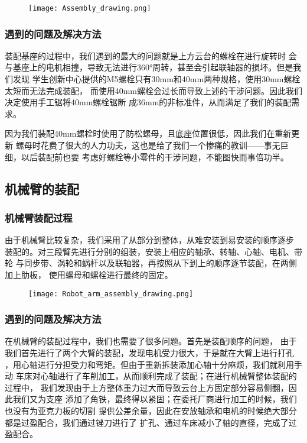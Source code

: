 \begin{figure}[!htp]
    \centering
    \texttt{[image: Assembly\_drawing.png]}
    \label{fig:基座装配图}
\end{figure}

\subsubsection{遇到的问题及解决方法}

{\songti 装配基座的过程中，我们遇到的最大的问题就是上方云台的螺栓在进行旋转时
会与基座上的电机相撞，导致无法进行360°周转，甚至会引起联轴器的损坏。但是我们发现
学生创新中心提供的M5螺栓只有30mm和40mm两种规格，使用30mm螺栓太短而无法完成装配，
而使用40mm螺栓会过长而导致上述的干涉问题。因此我们决定使用手工锯将40mm螺栓锯断
成36mm的非标准件，从而满足了我们的装配需求。}

{\songti 因为我们装配40mm螺栓时使用了防松螺母，且底座位置很低，因此我们在重新更新
螺母时花费了很大的人力功夫，这也是给了我们一个惨痛的教训——事无巨细，以后装配前也要
考虑好螺栓等小零件的干涉问题，不能图快而事倍功半。}


\subsection{机械臂的装配}

\subsubsection{机械臂装配过程}

{\songti 由于机械臂比较复杂，我们采用了从部分到整体，从难安装到易安装的顺序逐步
装配的。对三段臂先进行分别的组装，安装上相应的轴承、转轴、心轴、电机、带轮
与同步带、涡轮和蜗杆以及联轴器，再按照从下到上的顺序逐节装配，在两侧加上肋板，
使用螺母和螺栓进行最终的固定。}

\begin{figure}[!htp]
    \centering
    \texttt{[image: Robot\_arm\_assembly\_drawing.png]}
    \label{fig:机械臂装配图}
\end{figure}

\subsubsection{遇到的问题及解决方法}

{\songti 在机械臂的装配过程中，我们也需要了很多问题。首先是装配顺序的问题，
由于我们首先进行了两个大臂的装配，发现电机受力很大，于是就在大臂上进行打孔
，用心轴进行分担受力和弯矩。但由于重新拆装添加心轴十分麻烦，我们就利用手动
车床对心轴进行了车削加工，从而顺利完成了装配；在进行机械臂整体装配的过程中，
我们发现由于上方整体重力过大而导致云台上方固定部分容易侧翻，因此我们又为支座
添加了角铁，最终得以紧固；在委托厂商进行加工的时候，我们也没有为亚克力板的切割
提供公差余量，因此在安放轴承和电机的时候绝大部分都是过盈配合，我们通过锉刀进行了
扩孔、通过车床减小了轴的直径，完成了过盈配合。}

